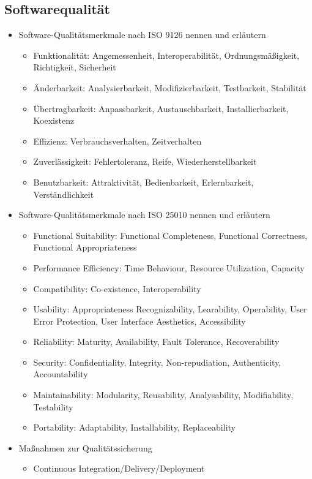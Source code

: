 \subsection{Softwarequalität}
\label{sec:Softwarequalitaet}

\begin{itemize}
	\item Software-Qualitätsmerkmale nach ISO 9126 nennen und erläutern
	\begin{itemize}
		\item Funktionalität: Angemessenheit, Interoperabilität, Ordnungsmäßigkeit, Richtigkeit, Sicherheit
		\item Änderbarkeit: Analysierbarkeit, Modifizierbarkeit, Testbarkeit, Stabilität
		\item Übertragbarkeit: Anpassbarkeit, Austauschbarkeit, Installierbarkeit, Koexistenz
		\item Effizienz: Verbrauchsverhalten, Zeitverhalten
		\item Zuverlässigkeit: Fehlertoleranz, Reife, Wiederherstellbarkeit
		\item Benutzbarkeit: Attraktivität, Bedienbarkeit, Erlernbarkeit, Verständlichkeit
	\end{itemize}
	\item Software-Qualitätsmerkmale nach ISO 25010 nennen und erläutern
	\begin{itemize}
		\item Functional Suitability: Functional Completeness, Functional Correctness, Functional Appropriateness
		\item Performance Efficiency: Time Behaviour, Resource Utilization, Capacity
		\item Compatibility: Co-existence, Interoperability
		\item Usability: Appropriateness Recognizability, Learability, Operability, User Error Protection, User Interface Aesthetics, Accessibility
		\item Reliability: Maturity, Availability, Fault Tolerance, Recoverability
		\item Security: Confidentiality, Integrity, Non-repudiation, Authenticity, Accountability
		\item Maintainability: Modularity, Reusability, Analysability, Modifiability, Testability
		\item Portability: Adaptability, Installability, Replaceability
	\end{itemize}
	\item Maßnahmen zur Qualitätssicherung
	\begin{itemize}
		\item Continuous Integration/Delivery/Deployment
	\end{itemize}
\end{itemize}